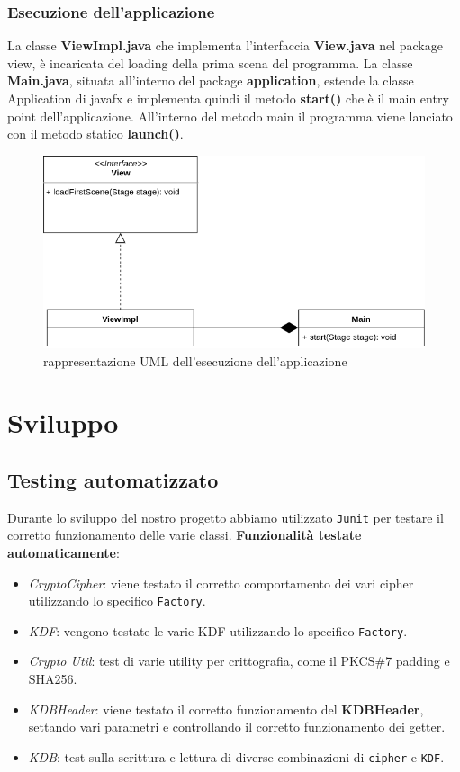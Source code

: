 \documentclass[a4paper,12pt]{report}
\begin{document}
\subsection*{Esecuzione dell'applicazione}
La classe \textbf{ViewImpl.java} che implementa l'interfaccia \textbf{View.java} nel package view, è incaricata del loading della prima scena del programma.
La classe \textbf{Main.java}, situata all'interno del package \textbf{application}, estende la classe Application di javafx e implementa quindi il metodo \textbf{start()} che è il main entry point dell'applicazione. All'interno del metodo main il programma viene lanciato con il metodo statico \textbf{launch()}.\\
\begin{figure}[h]
\centering{}
\includegraphics[width=\textwidth]{viewpart.png}
\caption{rappresentazione UML dell'esecuzione dell'applicazione}
\end{figure}

\chapter{Sviluppo}
\section{Testing automatizzato}

Durante lo sviluppo del nostro progetto abbiamo utilizzato \texttt{Junit} per
testare il corretto funzionamento delle varie classi.
\textbf{Funzionalità testate automaticamente}:
\begin{itemize}
  \item \textit{CryptoCipher}: viene testato il corretto comportamento dei vari cipher utilizzando lo specifico \texttt{Factory}.
  \item \textit{KDF}: vengono testate le varie KDF utilizzando lo specifico \texttt{Factory}.
  \item \textit{Crypto Util}: test di varie utility per crittografia, come il PKCS\#7 padding e SHA256.
  \item \textit{KDBHeader}: viene testato il corretto funzionamento del \textbf{KDBHeader}, settando vari parametri e controllando il corretto funzionamento dei getter.
  \item \textit{KDB}: test sulla scrittura e lettura di diverse combinazioni di \texttt{cipher} e \texttt{KDF}.
\end{itemize}
\end{document}
